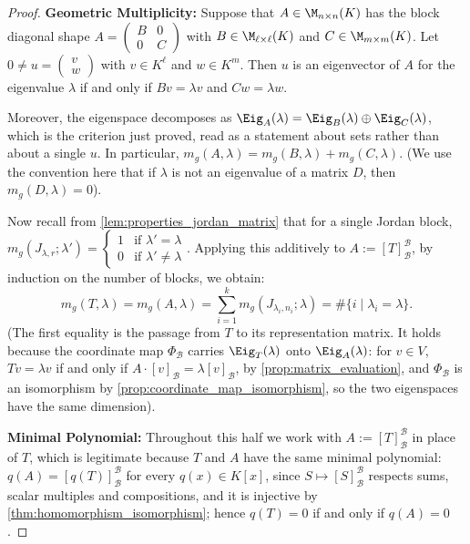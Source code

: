 \begin{proof}
\textbf{Geometric Multiplicity:} Suppose that $A \in \M_{n \times n}(K)$ has the block diagonal shape $A = \left(\begin{smallmatrix} B & 0 \\ 0 & C \end{smallmatrix}\right)$ with $B \in \M_{\ell \times \ell}(K)$ and $C \in \M_{m \times m}(K)$. Let $0 \neq u = \left(\begin{smallmatrix} v \\ w \end{smallmatrix}\right)$ with $v \in K^\ell$ and $w \in K^m$. Then $u$ is an eigenvector of $A$ for the eigenvalue $\lambda$ if and only if $Bv = \lambda v$ and $Cw = \lambda w$.

Moreover, the eigenspace decomposes as $\Eig_A(\lambda) = \Eig_B(\lambda) \oplus \Eig_C(\lambda)$, which is the criterion just proved, read as a statement about sets rather than about a single $u$. In particular, $m_g(A, \lambda) = m_g(B, \lambda) + m_g(C, \lambda)$. (We use the convention here that if $\lambda$ is not an eigenvalue of a matrix $D$, then $m_g(D, \lambda) = 0$).

Now recall from \cref{lem:properties_jordan_matrix} that for a single Jordan block, $m_g(J_{\lambda, r}; \lambda') = \begin{cases} 1 & \text{if } \lambda' = \lambda \\ 0 & \text{if } \lambda' \neq \lambda \end{cases}$.
Applying this additively to $A := [T]_{\mathcal{B}}^{\mathcal{B}}$, by induction on the number of blocks, we obtain:
\[
m_g(T, \lambda) = m_g(A, \lambda) = \sum_{i=1}^k m_g(J_{\lambda_i, n_i}; \lambda) = \# \{ i \mid \lambda_i = \lambda \}.
\]
(The first equality is the passage from $T$ to its representation matrix. It holds because the coordinate map $\Phi_{\mathcal{B}}$ carries $\Eig_T(\lambda)$ onto $\Eig_A(\lambda)$: for $v \in V$, $Tv = \lambda v$ if and only if $A \cdot [v]_{\mathcal{B}} = \lambda [v]_{\mathcal{B}}$, by \cref{prop:matrix_evaluation}, and $\Phi_{\mathcal{B}}$ is an isomorphism by \cref{prop:coordinate_map_isomorphism}, so the two eigenspaces have the same dimension).

\textbf{Minimal Polynomial:} Throughout this half we work with $A := [T]_{\mathcal{B}}^{\mathcal{B}}$ in place of $T$, which is legitimate because $T$ and $A$ have the same minimal polynomial: $q(A) = [q(T)]_{\mathcal{B}}^{\mathcal{B}}$ for every $q(x) \in K[x]$, since $S \mapsto [S]_{\mathcal{B}}^{\mathcal{B}}$ respects sums, scalar multiples and compositions, and it is injective by \cref{thm:homomorphism_isomorphism}; hence $q(T) = 0$ if and only if $q(A) = 0$.


\end{proof}
